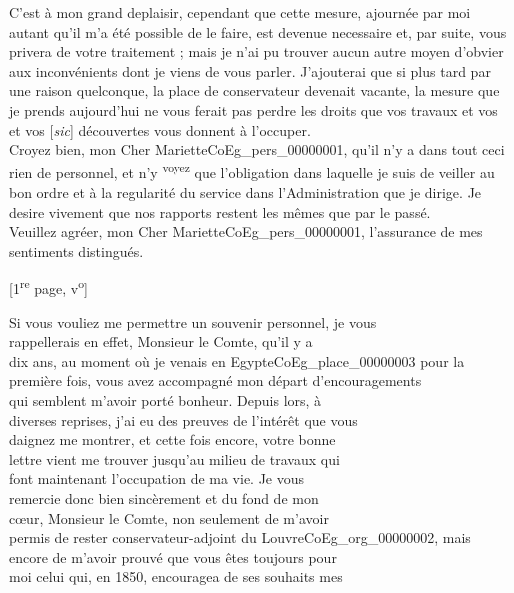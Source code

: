 \documentclass{book}
\begin{document}
{\indent C’est à mon grand deplaisir, cependant que cette mesure, ajournée par moi autant qu’il m’a été possible de le faire, est devenue necessaire et, par suite, vous privera de votre traitement ; mais je n’ai pu trouver aucun autre moyen d’obvier aux inconvénients dont je viens de vous parler. J’ajouterai que si plus tard par une raison quelconque, la place de conservateur devenait vacante, la mesure que je prends aujourd’hui ne vous ferait pas perdre les droits que vos travaux et vos et vos [\textit{sic}] découvertes vous donnent à l’occuper.\\
\indent Croyez bien, mon Cher Mariette\gls{CoEg_pers_00000001}, qu’il n’y a dans tout ceci rien de personnel, et n’y \textsuperscript{voyez} que l’obligation dans laquelle je suis de veiller au bon ordre et à la regularité du service dans l’Administration que je dirige. Je desire vivement que nos rapports restent les mêmes que par le passé.\\
\indent Veuillez agréer, mon Cher Mariette\gls{CoEg_pers_00000001}, l’assurance de mes sentiments distingués.~\fg}
{\footnotesize \begin{center} [1\textsuperscript{re} page, v\textsuperscript{o}]\end{center}}
\indent Si vous vouliez me permettre un souvenir personnel, je vous\\
rappellerais en effet, Monsieur le Comte, qu’il y a\\
dix ans, au moment où je venais en Egypte\gls{CoEg_place_00000003} pour la\\
première fois, vous avez accompagné mon départ d’encouragements\\
qui semblent m’avoir porté bonheur. Depuis lors, à\\
diverses reprises, j’ai eu des preuves de l’intérêt que vous\\
daignez me montrer, et cette fois encore, votre bonne\\
lettre vient me trouver jusqu’au milieu de travaux qui\\
font maintenant l’occupation de ma vie. Je vous\\
remercie donc bien sincèrement et du fond de mon\\
cœur, Monsieur le Comte, non seulement de m’avoir\\
permis de rester conservateur-adjoint du Louvre\gls{CoEg_org_00000002}, mais\\
encore de m’avoir prouvé que vous êtes toujours pour\\
moi celui qui, en 1850, encouragea de ses souhaits mes\\
\end{document}
